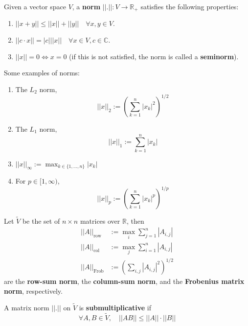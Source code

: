 \begin{definition}
	Given a vector space $V$, a \textbf{norm} $||.||: V \rightarrow \mathbb{R}_+$ satisfies the following properties:
	\begin{enumerate}
		\item $||x + y|| \le ||x|| + ||y|| \quad \forall x, y \in V$.
		\item $||c \cdot x|| = |c| ||x|| \quad \forall x \in V, c \in \mathbb{C}$.
		\item $||x|| = 0 \Longleftrightarrow x = 0$ (if this is not satisfied, the norm is called a \textbf{seminorm}).
	\end{enumerate}
\end{definition}

\begin{example}
	Some examples of norms:
	\begin{enumerate}
		\item The $L_2$ norm,
		\[
			{||x||}_2 := {\left( \sum_{k = 1}^{n} |x_k|^2 \right)}^{1/2}
		\]
		\item The $L_1$ norm,
		\[
			{||x||}_1 := \sum_{k = 1}^{n} |x_k|
		\]
		\item ${||x||}_{\infty} := \max_{k \in \{ 1, \dots, n \}} |x_k|$
		\item For $p \in [1, \infty)$,
		\[
			{||x||}_p := {\left( \sum_{k = 1}^{n} |x_k|^{p} \right)}^{1/p}
		\]
	\end{enumerate}
\end{example}

\begin{definition}
	Let $\tilde{V}$ be the set of $n \times n$ matrices over $\mathbb{R}$, then
	\[
		\begin{aligned}
			{||A||}_{\text{row}} & := \max_i \sum_{j = 1}^{n} |A_{i, j}| \\
			{||A||}_{\text{col}} & := \max_j \sum_{i = 1}^{n} |A_{i, j}| \\
			{||A||}_{\text{Frob}} & := {\left( \sum_{i, j} |A_{i, j}|^2 \right)}^{1/2}
		\end{aligned}
	\]
	are the \textbf{row-sum norm}, the \textbf{column-sum norm}, and the \textbf{Frobenius matrix norm}, respectively.
\end{definition}

\begin{definition}
	A matrix norm $||.||$ on $\tilde{V}$ is \textbf{submultiplicative} if
	\[
		\forall A, B \in \tilde{V}, \quad ||AB|| \le ||A|| \cdot ||B||
	\]
\end{definition}


